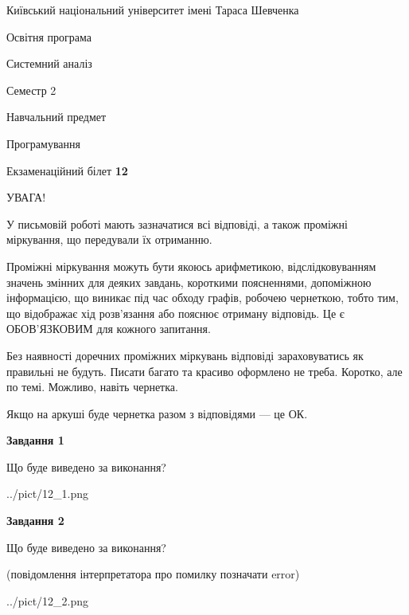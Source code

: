 \documentclass[12pt, ukrainian]{article}
\begin{document}
{{\begin {small}\par
{ \center  Київський національний університет імені Тараса Шевченка \par}
{\parbox {5 cm}{Освітня програма \hfill}{\parbox {7 cm}{Системний аналіз \hfill}}\parbox {6 cm}{\hfill Семестр 2}}\par
{\parbox {5 cm} {Навчальний предмет \hfill}\parbox {7 cm}{Програмування \hfill}\parbox {6cm}{\hfill}\par}\vspace{-7pt} \end{small}}{\center Екзаменаційний білет \No \textbf
{ 12 }\par}}
{
\begin {large}
УВАГА!

У письмовій роботі мають зазначатися всі відповіді, а також проміжні міркування, що передували їх отриманню.

Проміжні міркування можуть бути якоюсь арифметикою, відслідковуванням зна\-чень змінних для деяких завдань,
короткими поясненнями, допоміжною інформацією, що виникає під час обходу графів, робочею чернеткою,
тобто тим, що відображає хід розв’язання або пояснює отриману відповідь.
Це є ОБОВ’ЯЗКОВИМ для кожного запитання.

Без наявності доречних проміжних міркувань відповіді зараховуватись як правиль\-ні не будуть.
Писати багато та красиво оформлено не треба. Коротко, але по темі. Можли\-во, навіть чернетка.

Якщо на аркуші буде чернетка разом з відповідями --- це ОК.

\newpage

{\begin {center}\textbf{Завдання 1}\end {center}}\par
Що буде виведено за виконання?\par
\begin{center}
	{../pict/12_1.png}
\end{center}
\newpage

{\begin {center}\textbf{Завдання 2}\end {center}}\par
Що буде виведено за виконання?\par
 (повідомлення інтерпретатора про помилку позначати error)\par
\begin{center}
	{../pict/12_2.png}
\end{center}
\newpage


\end{large}}
\end{document}

